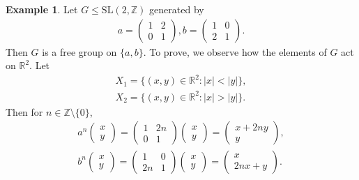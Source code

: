 \documentclass[12pt]{report}
\theoremstyle{plain}
\theoremstyle{remark}
\theoremstyle{definition}
\newtheorem{example}[theorem]{Example}
\newcommand{\Z}{\mathbb{Z}}
\newcommand{\R}{\mathbb{R}}
\begin{document}
\begin{example}
    Let $G\le \mathrm{SL}(2,\Z)$ generated by
    \begin{align*}
        a = \begin{pmatrix}
            1 & 2 \\ 0 & 1
        \end{pmatrix},b=\begin{pmatrix}
            1 & 0 \\ 2 & 1
        \end{pmatrix}.
    \end{align*}
    Then $G$ is a free group on $\{a,b\}$. To prove, we observe how the elements of $G$ act on $\R^2$. Let
    \begin{align*}
        X_1 = \{(x,y)\in\R^2:|x|<|y|\}, \\
        X_2 = \{(x,y)\in\R^2:|x|>|y|\}.
    \end{align*}
    Then for $n\in\Z\setminus \{0\}$,
    \begin{align*}
        a^n\begin{pmatrix}
            x \\ y
        \end{pmatrix} = \begin{pmatrix}
            1 & 2n \\ 0 & 1
        \end{pmatrix} \begin{pmatrix}
            x \\ y
        \end{pmatrix} = \begin{pmatrix}
            x+2ny \\ y
        \end{pmatrix}, \\
        b^n\begin{pmatrix}
            x \\ y
        \end{pmatrix} = \begin{pmatrix}
            1 & 0 \\ 2n & 1
        \end{pmatrix} \begin{pmatrix}
            x \\ y
        \end{pmatrix} = \begin{pmatrix}
            x \\ 2nx + y
        \end{pmatrix}.
    \end{align*}

\end{example}
\end{document}
